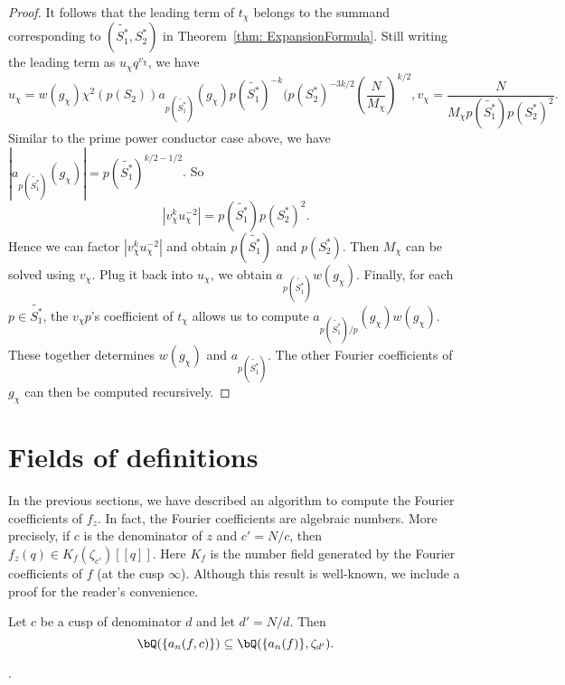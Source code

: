 \documentclass [11pt, proquest] {uwthesis}[2015/03/03]
\begin{document}
\begin{proof}
It follows that the leading term of $t_\chi$ belongs to the summand corresponding to $(\widetilde{S_1^*}, S_2^*)$ in  Theorem~\ref{thm: ExpansionFormula}. Still writing the leading term as $u_\chi q^{v_\chi}$, we have 
\[
	u_\chi = w(g_\chi) \chi^2(p(S_2)) a_{p(\widetilde{S_1^*})}(g_\chi) p(\widetilde{S_1^*})^{-k} (p(S_2^*)^{-3k/2} \left(\frac{N}{M_\chi}\right)^{k/2}, v_\chi = \frac{N}{M_\chi p(\widetilde{S_1^*}) p(S_2^*)^2}. 
\]
Similar to the prime power conductor case above, we have $|a_{p(\widetilde{S_1^*})}(g_\chi)|  = p(\widetilde{S_1^*})^{k/2 -1/2}$.  So 
\begin{equation} \label{formula: converse}
	|v_\chi^{k} u_\chi^{-2}| = p(\widetilde{S_1^*}) p(S_2^*)^2.
\end{equation}
Hence we can factor $|v_\chi^{k} u_\chi^{-2}|$ and obtain $p(\widetilde{S_1^*})$
and $p(S_2^*)$. Then $M_\chi$ can be solved using $v_\chi$. Plug it back into $u_\chi$, we obtain $a_{p(\widetilde{S_1^*})} w(g_\chi)$. Finally, for each $p \in \widetilde{S_1^*}$,  the $v_\chi p$'s coefficient of 
$t_\chi$ allows us to compute $a_{p(\widetilde{S_1^*})/p}(g_\chi) w(g_\chi)$. These together determines $w(g_\chi)$ and 
$a_{p(\widetilde{S_1^*})}$. The other Fourier coefficients of $g_\chi$ can then be computed recursively. 
\end{proof}




\section{Fields of definitions}

In the previous sections, we have described an algorithm to compute the Fourier coefficients of $f_z$. In fact, the Fourier coefficients are algebraic numbers. More precisely, if $c$ is the denominator of  $z$ and $c' = N/c$, then $f_z (q) \in K_f(\zeta_{c'})[[q]]$. Here $K_f$ is the number field generated by the Fourier coefficients of $f$ (at the cusp $\infty$). Although this result is well-known, we include a proof for the reader's convenience.
\begin{Lemma}
Let $c$ be a cusp of denominator $d$ and let $d' = N/d$. Then 
\[
	\bQ(\{a_n(f, c)\}) \subseteq \bQ( \{a_n(f)\}, \zeta_{d'}). 
\]
\end{Lemma}

 \cite{diamond1995modular}. 

\end{document}
